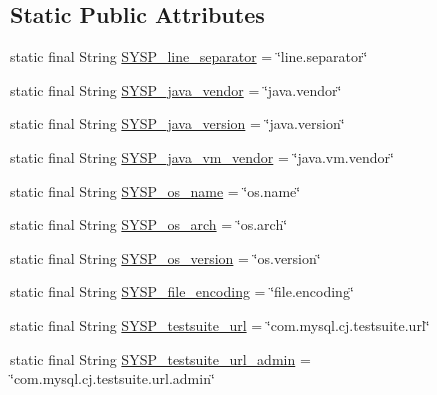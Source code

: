\subsection*{Static Public Attributes}
\begin{DoxyCompactItemize}
\item 
static final String \mbox{\hyperlink{classcom_1_1mysql_1_1cj_1_1conf_1_1_property_definitions_a7ad33d4955dc2333a789694c36834963}{S\+Y\+S\+P\+\_\+line\+\_\+separator}} = \char`\"{}line.\+separator\char`\"{}
\item 
static final String \mbox{\hyperlink{classcom_1_1mysql_1_1cj_1_1conf_1_1_property_definitions_ade5a798ae5df535e089de31c110b5071}{S\+Y\+S\+P\+\_\+java\+\_\+vendor}} = \char`\"{}java.\+vendor\char`\"{}
\item 
static final String \mbox{\hyperlink{classcom_1_1mysql_1_1cj_1_1conf_1_1_property_definitions_a26836091c7698711cc07879dcd93101b}{S\+Y\+S\+P\+\_\+java\+\_\+version}} = \char`\"{}java.\+version\char`\"{}
\item 
static final String \mbox{\hyperlink{classcom_1_1mysql_1_1cj_1_1conf_1_1_property_definitions_a824b63ec54370c88308327dd58f5dc1f}{S\+Y\+S\+P\+\_\+java\+\_\+vm\+\_\+vendor}} = \char`\"{}java.\+vm.\+vendor\char`\"{}
\item 
static final String \mbox{\hyperlink{classcom_1_1mysql_1_1cj_1_1conf_1_1_property_definitions_affddcdb4224734f2d11b00c102129fd0}{S\+Y\+S\+P\+\_\+os\+\_\+name}} = \char`\"{}os.\+name\char`\"{}
\item 
static final String \mbox{\hyperlink{classcom_1_1mysql_1_1cj_1_1conf_1_1_property_definitions_aad0eadeb6d00c44a7e2558ff1d4e999e}{S\+Y\+S\+P\+\_\+os\+\_\+arch}} = \char`\"{}os.\+arch\char`\"{}
\item 
static final String \mbox{\hyperlink{classcom_1_1mysql_1_1cj_1_1conf_1_1_property_definitions_a5db67a2d1c7d5424b1b8e46c506fc350}{S\+Y\+S\+P\+\_\+os\+\_\+version}} = \char`\"{}os.\+version\char`\"{}
\item 
static final String \mbox{\hyperlink{classcom_1_1mysql_1_1cj_1_1conf_1_1_property_definitions_a66487c1a3fb2e2e4e317c1dd76cfbc41}{S\+Y\+S\+P\+\_\+file\+\_\+encoding}} = \char`\"{}file.\+encoding\char`\"{}
\item 
static final String \mbox{\hyperlink{classcom_1_1mysql_1_1cj_1_1conf_1_1_property_definitions_afb6b7524dc5ef5f820f4638083c07e0e}{S\+Y\+S\+P\+\_\+testsuite\+\_\+url}} = \char`\"{}com.\+mysql.\+cj.\+testsuite.\+url\char`\"{}
\item 
static final String \mbox{\hyperlink{classcom_1_1mysql_1_1cj_1_1conf_1_1_property_definitions_ae149a58f7b216c5aa7431ff6738fc6f5}{S\+Y\+S\+P\+\_\+testsuite\+\_\+url\+\_\+admin}} = \char`\"{}com.\+mysql.\+cj.\+testsuite.\+url.\+admin\char`\"{}

\end{DoxyCompactItemize}

